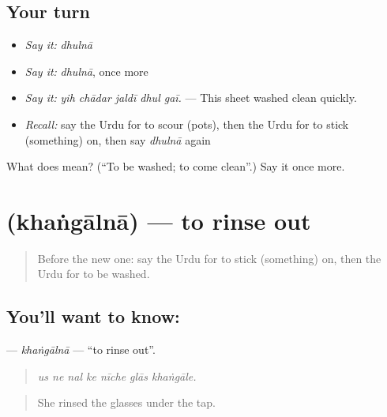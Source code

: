 \subsection*{Your turn}
\begin{itemize}
\raggedright
  \item \emph{Say it:} \emph{dhulnā}
  \item \emph{Say it:} \emph{dhulnā}, once more
  \item \emph{Say it:} \emph{yih chādar jaldī dhul gaī.} — This sheet washed clean quickly.
  \item \emph{Recall:} say the Urdu for to scour (pots), then the Urdu for to stick (something) on, then say \emph{dhulnā} again
\end{itemize}

\begin{tcolorbox}[breakable,colback=teal!4,colframe=teal!35!black,title={Before you move on}]
What does  mean? (\textquotedblleft{}To be washed; to come clean\textquotedblright{}.) Say it once more.
\end{tcolorbox}
\section[\texorpdfstring{\ur{کھنگالنا} (khaṅgālnā)}{کھنگالنا (khaṅgālnā)}]{ (khaṅgālnā) — to rinse out}

\label{lesson:UR-C506-khangalna}



\begin{quote}
Before the new one: say the Urdu for to stick (something) on, then the Urdu for to be washed.
\end{quote}

\subsection*{You'll want to know: }
\textbf{} — \emph{khaṅgālnā} — \textquotedblleft{}to rinse out\textquotedblright{}.

\begin{quote}
      
\end{quote}

\begin{quote}
\emph{us ne nal ke nīche glās khaṅgāle.}
\end{quote}

\begin{quote}
She rinsed the glasses under the tap.
\end{quote}

